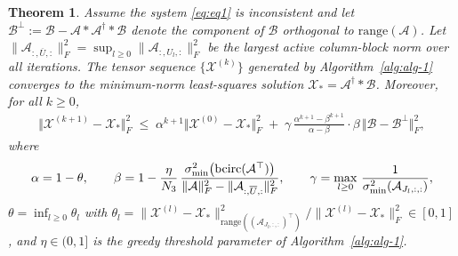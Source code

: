 \documentclass[11pt]{article}
\newtheorem{theorem}{Theorem}[section]
\def\fm#1{\mathcal{#1}}
\begin{document}
\begin{theorem}
Assume the system \eqref{eq:eq1} is inconsistent and let
$\fm B^\perp := \fm B - \fm A * \fm A^\dagger * \fm B$
denote the component of $\fm B$ orthogonal to $\mathrm{range}(\fm A)$.
Let $\|\fm A_{:,\overline{U},:}\|_F^2 = \sup_{l \geq 0}\|\fm A_{:,U_l,:}\|_F^2$
be the largest active column-block norm over all iterations.
The tensor sequence $\{\fm X^{(k)}\}$ generated by Algorithm~\ref{alg:alg-1}
converges to the minimum-norm least-squares solution $\fm X_\ast = \fm A^\dagger * \fm B$.
Moreover, for all $k \geq 0$,
\begin{align}
    \Vert \fm X^{(k+1)} - \fm X_\ast \Vert_F^2
    \;\leq\;
    \alpha^{k+1}\Vert \fm X^{(0)} - \fm X_\ast \Vert_F^2
    \;+\;
    \gamma\,\frac{\alpha^{k+1}-\beta^{k+1}}{\alpha - \beta}
    \cdot\beta
    \,\Vert \fm B - \fm B^\perp \Vert_F^2,
\end{align}
where
\begin{align*}
\alpha = 1 - \theta,
\qquad
\beta  = 1 - \frac{\eta}{N_3}\,
    \frac{\sigma_{\min}^2\!\left(\bcirc(\fm A^\top)\right)}
         {\|\fm A\|_F^2 - \|\fm A_{:,\overline{U},:}\|_F^2},
\qquad
\gamma = \max_{l \geq 0}\,\frac{1}{\sigma_{\min}^2\!\left(\fm A_{J_l,:,:}\right)},
\end{align*}
$\theta = \inf_{l \geq 0}\theta_l$ with
$\theta_l = \|\fm X^{(l)} - \fm X_\ast\|^2_{\mathrm{range}((\fm A_{J_l,:,:})^\top)}\big/
            \|\fm X^{(l)} - \fm X_\ast\|_F^2 \in [0,1]$,
and $\eta \in (0,1]$ is the greedy threshold parameter of Algorithm~\ref{alg:alg-1}.
\end{theorem}
\end{document}
